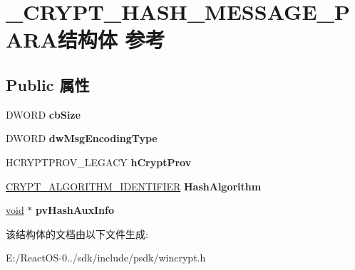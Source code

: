 \hypertarget{struct___c_r_y_p_t___h_a_s_h___m_e_s_s_a_g_e___p_a_r_a}{}\section{\+\_\+\+C\+R\+Y\+P\+T\+\_\+\+H\+A\+S\+H\+\_\+\+M\+E\+S\+S\+A\+G\+E\+\_\+\+P\+A\+R\+A结构体 参考}
\label{struct___c_r_y_p_t___h_a_s_h___m_e_s_s_a_g_e___p_a_r_a}
\subsection*{Public 属性}
\begin{DoxyCompactItemize}
\item 
\mbox{\label{struct___c_r_y_p_t___h_a_s_h___m_e_s_s_a_g_e___p_a_r_a_a2d404c295cd1546f51536417cf33011d}} 
D\+W\+O\+RD {\bfseries cb\+Size}
\item 
\mbox{\label{struct___c_r_y_p_t___h_a_s_h___m_e_s_s_a_g_e___p_a_r_a_af0a6ff57f22dad204a2fb6f471e8a7e8}} 
D\+W\+O\+RD {\bfseries dw\+Msg\+Encoding\+Type}
\item 
\mbox{\label{struct___c_r_y_p_t___h_a_s_h___m_e_s_s_a_g_e___p_a_r_a_aaa7027ecd293f55942d7ffbafc5d9d06}} 
H\+C\+R\+Y\+P\+T\+P\+R\+O\+V\+\_\+\+L\+E\+G\+A\+CY {\bfseries h\+Crypt\+Prov}
\item 
\mbox{\label{struct___c_r_y_p_t___h_a_s_h___m_e_s_s_a_g_e___p_a_r_a_a63798cff14b17f4d209d2faef6573a24}} 
\hyperlink{struct___c_r_y_p_t___a_l_g_o_r_i_t_h_m___i_d_e_n_t_i_f_i_e_r}{C\+R\+Y\+P\+T\+\_\+\+A\+L\+G\+O\+R\+I\+T\+H\+M\+\_\+\+I\+D\+E\+N\+T\+I\+F\+I\+ER} {\bfseries Hash\+Algorithm}
\item 
\mbox{\label{struct___c_r_y_p_t___h_a_s_h___m_e_s_s_a_g_e___p_a_r_a_add41ebbe1f8c37d2fdba28aa759a2c7a}} 
\hyperlink{interfacevoid}{void} $\ast$ {\bfseries pv\+Hash\+Aux\+Info}
\end{DoxyCompactItemize}


该结构体的文档由以下文件生成\+:\begin{DoxyCompactItemize}
\item 
E\+:/\+React\+O\+S-\/0../sdk/include/psdk/wincrypt.\+h\end{DoxyCompactItemize}
